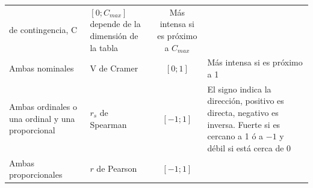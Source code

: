 \documentclass[]{book}
\begin{document}
\begin{longtable}[]{@{}llcl@{}}
\begin{minipage}[t]{0.14\columnwidth}
de contingencia, C\strut
\end{minipage} & \begin{minipage}[t]{0.15\columnwidth}\centering
\([0; C_{max}]\) depende de la dimensión de la tabla\strut
\end{minipage} & \begin{minipage}[t]{0.38\columnwidth}\raggedright
Más intensa si es próximo a \(C_{max}\)\strut
\end{minipage}\tabularnewline
\begin{minipage}[t]{0.22\columnwidth}\raggedright
Ambas nominales\strut
\end{minipage} & \begin{minipage}[t]{0.14\columnwidth}\raggedright
V de Cramer\strut
\end{minipage} & \begin{minipage}[t]{0.15\columnwidth}\centering
\([0; 1]\)\strut
\end{minipage} & \begin{minipage}[t]{0.38\columnwidth}\raggedright
Más intensa si es próximo a 1\strut
\end{minipage}\tabularnewline
\begin{minipage}[t]{0.22\columnwidth}\raggedright
Ambas ordinales o una ordinal y una proporcional\strut
\end{minipage} & \begin{minipage}[t]{0.14\columnwidth}\raggedright
\(r_s\) de Spearman\strut
\end{minipage} & \begin{minipage}[t]{0.15\columnwidth}\centering
\([-1; 1]\)\strut
\end{minipage} & \begin{minipage}[t]{0.38\columnwidth}\raggedright
El signo indica la dirección, positivo es directa, negativo es inversa. Fuerte si es cercano a 1 ó a \(-1\) y débil si está cerca de 0\strut
\end{minipage}\tabularnewline
\begin{minipage}[t]{0.22\columnwidth}\raggedright
Ambas proporcionales\strut
\end{minipage} & \begin{minipage}[t]{0.14\columnwidth}\raggedright
\(r\) de Pearson\strut
\end{minipage} & \begin{minipage}[t]{0.15\columnwidth}\centering
\([-1; 1]\)\strut
\end{minipage} & \begin{minipage}[t]{0.38\columnwidth}\raggedright

\end{minipage}
\end{longtable}
\end{document}
